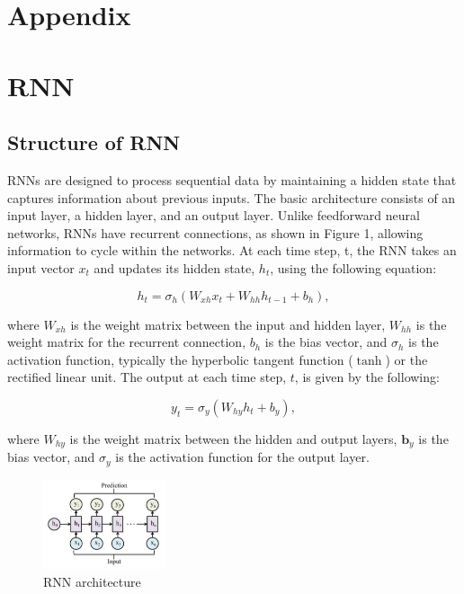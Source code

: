 \documentclass[11pt]{article}
\begin{document}
\section*{Appendix}
\section{RNN}

\subsection{Structure of RNN}

RNNs are designed to process sequential data by maintaining a hidden state that
captures information about previous inputs. The basic architecture consists of an input
layer, a hidden layer, and an output layer. Unlike feedforward neural networks, RNNs
have recurrent connections, as shown in Figure 1, allowing information to cycle within the
networks. At each time step, t, the RNN takes an input vector $x_t$  and updates its hidden state, $h_t$, using the following equation: 

\[
h_t = \sigma_h (W_{xh} x_t + W_{hh} h_{t-1} + b_h),
\]

where \( W_{xh} \) is the weight matrix between the input and hidden layer, \( W_{hh} \) is the weight matrix for the recurrent connection, \( b_h \) is the bias vector, and \( \sigma_h \) is the activation function, typically the hyperbolic tangent function (\(\tanh\)) or the rectified linear unit.
 The output at each time step, \( t \), is given by the following:

\[
y_t = \sigma_y(W_{hy} h_t + b_y),
\]

where \( W_{hy} \) is the weight matrix between the hidden and output layers, \( \mathbf{b}_y \) is the bias vector, and \( \sigma_y \) is the activation function for the output layer.

\begin{figure}[h]
    \centering
    \includegraphics[width=0.32\textwidth]{rnn.png}
    \caption{RNN architecture}
    \label{fig:rnn_structure}
\end{figure}
\end{document}
